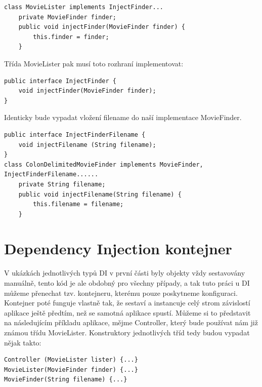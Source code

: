 \documentclass[a4paper,conference]{IEEEtran}
\begin{document}
\lstset{language=Java,caption=Třída MovieLister implementující definované rozhraní,label=listing:Java}
\begin{lstlisting}
class MovieLister implements InjectFinder...
    private MovieFinder finder;
    public void injectFinder(MovieFinder finder) {
        this.finder = finder;
    }
\end{lstlisting}

Třída MovieLister pak musí toto rozhraní implementovat:

\lstset{language=Java,caption=Interface pro interface injection,label=listing:Java}
\begin{lstlisting}
public interface InjectFinder {
    void injectFinder(MovieFinder finder);
}
\end{lstlisting}

Identicky bude vypadat vložení filename do naší implementace MovieFinder.

\lstset{language=Java,caption=Implementace MovieLister u InterfaceInjection,label=listing:Java}
\begin{lstlisting}
public interface InjectFinderFilename {
    void injectFilename (String filename);
}
class ColonDelimitedMovieFinder implements MovieFinder, InjectFinderFilename......
    private String filename;
    public void injectFilename(String filename) {
        this.filename = filename;
    }
\end{lstlisting}

\section{Dependency Injection kontejner}
\label{sec:Container}

V ukázkách jednotlivých typů DI v první části byly objekty vždy sestavovány manuálně, tento kód je ale obdobný pro všechny případy, a tak tuto práci u DI můžeme přenechat tzv. kontejneru, kterému pouze poskytneme konfiguraci. Kontejner poté funguje vlastně tak, že sestaví a instancuje celý strom závislostí aplikace ještě předtím, než se samotná aplikace spustí. Můžeme si to představit na následujícím příkladu aplikace, mějme Controller, který bude používat nám již známou třídu MovieLister. Konstruktory jednotlivých tříd tedy budou vypadat nějak takto:

\lstset{language=Java,caption=Konstruktory tříd k příkladu,label=listing:Java}
\begin{lstlisting}
Controller (MovieLister lister) {...}
MovieLister(MovieFinder finder) {...}
MovieFinder(String filename) {...}
\end{lstlisting}
\end{document}
